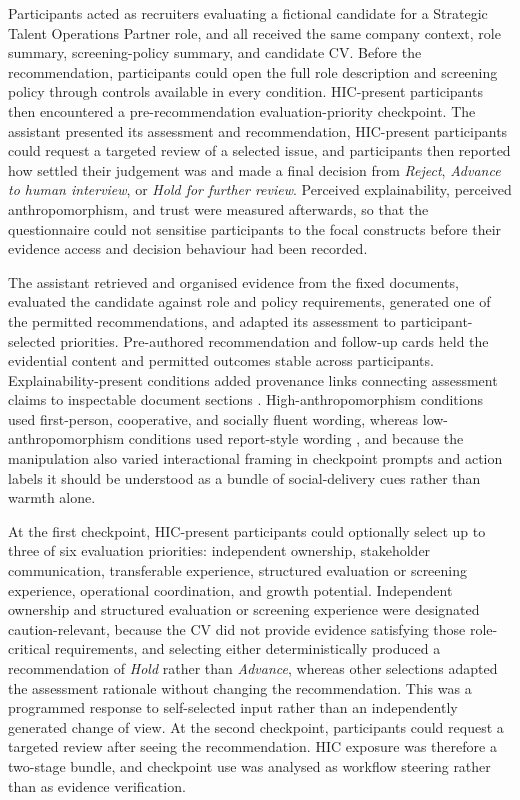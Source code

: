 Participants acted as recruiters evaluating a fictional candidate for a
Strategic Talent Operations Partner role, and all received the same company
context, role summary, screening-policy summary, and candidate CV. Before
the recommendation, participants could open the full role description and
screening policy through controls available in every condition. HIC-present
participants then encountered a pre-recommendation evaluation-priority
checkpoint. The assistant presented its assessment and recommendation,
HIC-present participants could request a targeted review of a selected
issue, and participants then reported how settled their judgement was and
made a final decision from \emph{Reject}, \emph{Advance to human
interview}, or \emph{Hold for further review}. Perceived explainability,
perceived anthropomorphism, and trust were measured afterwards, so that the
questionnaire could not sensitise participants to the focal constructs
before their evidence access and decision behaviour had been recorded.

The assistant retrieved and organised evidence from the fixed documents,
evaluated the candidate against role and policy requirements, generated one
of the permitted recommendations, and adapted its assessment to
participant-selected priorities. Pre-authored recommendation and follow-up
cards held the evidential content and permitted outcomes stable across
participants. Explainability-present conditions added provenance links
connecting assessment claims to inspectable document sections
\cite{qi_model_2024}. High-anthropomorphism conditions used first-person,
cooperative, and socially fluent wording, whereas low-anthropomorphism
conditions used report-style wording \cite{araujo_living_2018,
stinkeste_linguistic_2025}, and because the manipulation also varied
interactional framing in checkpoint prompts and action labels it should be
understood as a bundle of social-delivery cues rather than warmth alone.

At the first checkpoint, HIC-present participants could optionally select
up to three of six evaluation priorities: independent ownership,
stakeholder communication, transferable experience, structured evaluation
or screening experience, operational coordination, and growth potential.
Independent ownership and structured evaluation or screening experience
were designated caution-relevant, because the CV did not provide evidence
satisfying those role-critical requirements, and selecting either
deterministically produced a recommendation of \emph{Hold} rather than
\emph{Advance}, whereas other selections adapted the assessment rationale
without changing the recommendation. This was a programmed response to
self-selected input rather than an independently generated change of view.
At the second checkpoint, participants could request a targeted review
after seeing the recommendation. HIC exposure was therefore a two-stage
bundle, and checkpoint use was analysed as workflow steering rather than as
evidence verification.

